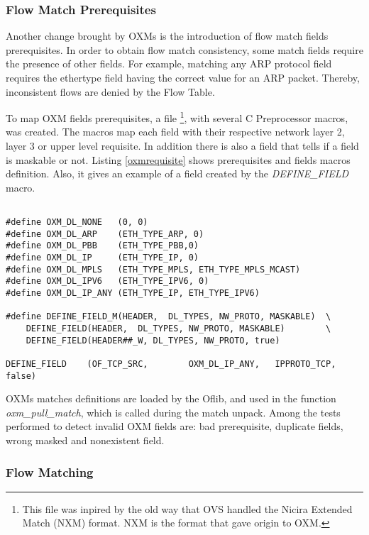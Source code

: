     \subsubsection{Flow Match Prerequisites}
    
    Another change brought by OXMs is the introduction of flow match fields prerequisites. In order to obtain flow match consistency, some match fields require the presence of other fields. For example, matching any ARP protocol field requires the ethertype field having the correct value for an ARP packet. Thereby, inconsistent flows are denied by the Flow Table.  
      
    To map OXM fields prerequisites, a file \footnote{This file was inpired by the old way that OVS handled the Nicira Extended Match (NXM) format. NXM is the format that gave origin to OXM.}, with several C Preprocessor macros, was created. The macros map each field with their respective network layer 2, layer 3 or upper level requisite. In addition there is also a field that tells if a field is maskable or not. Listing \ref{oxmrequisite} shows prerequisites and fields macros definition. Also, it gives an example of a field created by the \textit{DEFINE_FIELD} macro. 
\\
\begin{lstlisting}[caption={Ethernet parsing in the nbee_link module}, label=oxmrequisite,]

#define OXM_DL_NONE   (0, 0)
#define OXM_DL_ARP    (ETH_TYPE_ARP, 0)
#define OXM_DL_PBB    (ETH_TYPE_PBB,0)
#define OXM_DL_IP     (ETH_TYPE_IP, 0)
#define OXM_DL_MPLS   (ETH_TYPE_MPLS, ETH_TYPE_MPLS_MCAST)
#define OXM_DL_IPV6   (ETH_TYPE_IPV6, 0)
#define OXM_DL_IP_ANY (ETH_TYPE_IP, ETH_TYPE_IPV6)

#define DEFINE_FIELD_M(HEADER,  DL_TYPES, NW_PROTO, MASKABLE)  \
    DEFINE_FIELD(HEADER,  DL_TYPES, NW_PROTO, MASKABLE)        \
    DEFINE_FIELD(HEADER##_W, DL_TYPES, NW_PROTO, true)

DEFINE_FIELD    (OF_TCP_SRC,        OXM_DL_IP_ANY,   IPPROTO_TCP,    false)

\end{lstlisting}   

    OXMs matches definitions are loaded by the Oflib, and used in the function \textit{oxm_pull_match}, which is called during the match unpack. Among the tests performed to detect invalid OXM fields are: bad prerequisite, duplicate fields, wrong masked and nonexistent field.  

    \subsubsection{Flow Matching}
    
